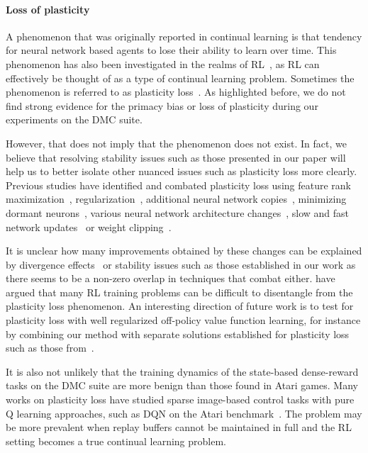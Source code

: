\paragraph{Loss of plasticity}
A phenomenon that was originally reported in continual learning is that tendency for neural network based agents to lose their ability to learn over time. This phenomenon has also been investigated in the realms of RL~\textcite{igl2021transient}, as RL can effectively be thought of as a type of continual learning problem. Sometimes the phenomenon is referred to as plasticity loss~\textcite{lyle2022understanding, abbas2023loss}. 
As highlighted before, we do not find strong evidence for the primacy bias or loss of plasticity during our experiments on the DMC suite. 

However, that does not imply that the phenomenon does not exist. In fact, we believe that resolving stability issues such as those presented in our paper will help us to better isolate other nuanced issues such as plasticity loss more clearly.
Previous studies have identified and combated plasticity loss using feature rank maximization~\textcite{kumar2021implicit}, regularization~\textcite{lyle2023understanding}, additional neural network copies~\textcite{nikishin2024deep}, minimizing dormant neurons~\textcite{sokar2023dormant, xu2024drm}, various neural network architecture changes~\textcite{lee2023plastic}, slow and fast network updates~\textcite{lee2024slow} or weight clipping~\textcite{elsayed2024weightclipping}. 

It is unclear how many improvements obtained by these changes can be explained by divergence effects~\textcite{hussing2024dissecting} or stability issues such as those established in our work as there seems to be a non-zero overlap in techniques that combat either. 
\textcite{nauman2024overestimation} have argued that many RL training problems can be difficult to disentangle from the plasticity loss phenomenon.
An interesting direction of future work is to test for plasticity loss with well regularized off-policy value function learning, for instance by combining our method with separate solutions established for plasticity loss such as those from~\textcite{lyle2024disentangling}. 

It is also not unlikely that the training dynamics of the state-based dense-reward tasks on the DMC suite are more benign than those found in Atari games. 
Many works on plasticity loss have studied sparse image-based control tasks with pure Q learning approaches, such as DQN on the Atari benchmark~\textcite{sokar2023dormant, lee2024slow}. 
The problem may be more prevalent when replay buffers cannot be maintained in full and the RL setting becomes a true continual learning problem.

